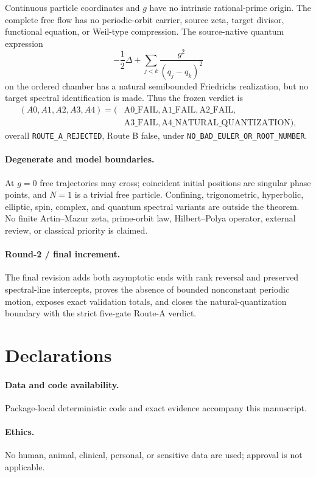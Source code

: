 \documentclass[9pt]{extarticle}
\begin{document}
Continuous particle coordinates and $g$ have no intrinsic rational-prime
origin.  The complete free flow has no periodic-orbit carrier, source zeta,
target divisor, functional equation, or Weil-type compression.  The
source-native quantum expression
\[
 -\frac12\Delta+\sum_{j<k}\frac{g^2}{(q_j-q_k)^2}
\]
on the ordered chamber has a natural semibounded Friedrichs realization, but
no target spectral identification is made.  Thus the frozen verdict is
\[
\begin{aligned}
 (A0,A1,A2,A3,A4)=(&\mathrm{A0\_FAIL},\mathrm{A1\_FAIL},
 \mathrm{A2\_FAIL},\\
 &\mathrm{A3\_FAIL},\mathrm{A4\_NATURAL\_QUANTIZATION}),
\end{aligned}
\]
overall \texttt{ROUTE\_A\_REJECTED}, Route B false, under
\texttt{NO\_BAD\_EULER\_OR\_ROOT\_NUMBER}.

\paragraph{Degenerate and model boundaries.}
At $g=0$ free trajectories may cross; coincident initial positions are
singular phase points, and $N=1$ is a trivial free particle.  Confining,
trigonometric, hyperbolic, elliptic, spin, complex, and quantum spectral
variants are outside the theorem.  No finite Artin--Mazur zeta, prime-orbit
law, Hilbert--Polya operator, external review, or classical priority is
claimed.

\paragraph{Round-2 / final increment.}
The final revision adds both asymptotic ends with rank reversal and preserved
spectral-line intercepts, proves the absence of bounded nonconstant periodic
motion, exposes exact validation totals, and closes the natural-quantization
boundary with the strict five-gate Route-A verdict.

\section*{Declarations}
\paragraph{Data and code availability.} Package-local deterministic code and
exact evidence accompany this manuscript.
\paragraph{Ethics.} No human, animal, clinical, personal, or sensitive data
are used; approval is not applicable.
\end{document}
